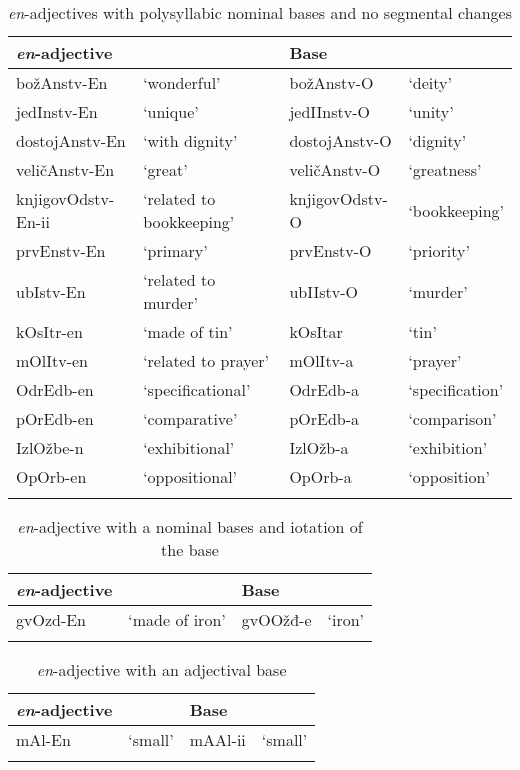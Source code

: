 \documentclass[output=paper]{langsci/langscibook}
\begin{document}
\begin{table}    
\caption{\textit{en}-adjectives with polysyllabic nominal bases and no segmental changes} 
\label{tabapp10}          
 \begin{tabular}{l l l l}          
\lsptoprule            
\textit{en}-adjective &  & Base & \\
\hline 
božAnstv-En & `wonderful' & božAnstv-O & `deity' \\
  jedInstv-En & `unique' & jedIInstv-O & `unity' \\
  dostojAnstv-En & `with dignity' & dostojAnstv-O & `dignity' \\
  veličAnstv-En & `great' & veličAnstv-O & `greatness' \\
  knjigovOdstv-En-ii & `related to bookkeeping' & knjigovOdstv-O & `bookkeeping' \\
  prvEnstv-En & `primary' & prvEnstv-O & `priority' \\
  ubIstv-En & `related to murder' & ubIIstv-O & `murder'\\ 
  kOsItr-en & `made of tin' & kOsItar & `tin' \\
  mOlItv-en & `related to prayer' & mOlItv-a & `prayer' \\
  OdrEdb-en & `specificational' & OdrEdb-a & `specification' \\
  pOrEdb-en & `comparative' & pOrEdb-a & `comparison' \\
  IzlOžbe-n & `exhibitional' & IzlOžb-a & `exhibition' \\
  OpOrb-en & `oppositional' & OpOrb-a & `opposition' \\
 \lspbottomrule          
 \end{tabular}          
\end{table}           
          
\begin{table}          
\caption{\textit{en}-adjective with a nominal bases and iotation of the base}
\label{tabapp11}          
 \begin{tabular}{ l l l l}          
\lsptoprule            
 \textit{en}-adjective &  & Base &      \\ 
\hline
gvOzd-En & `made of iron' & gvOOžđ-e & `iron' \\
 \lspbottomrule          
 \end{tabular}          
\end{table}           
          
\begin{table}  
\caption{\textit{en}-adjective with an adjectival base}          
\label{tabapp12}          
 \begin{tabular}{ l l l l}          
\lsptoprule            
\textit{en}-adjective &  & Base &  \\
\hline
mAl-En & `small' & mAAl-ii & `small'\\
 \lspbottomrule          
 \end{tabular}          
\end{table}           
          
\end{document}
